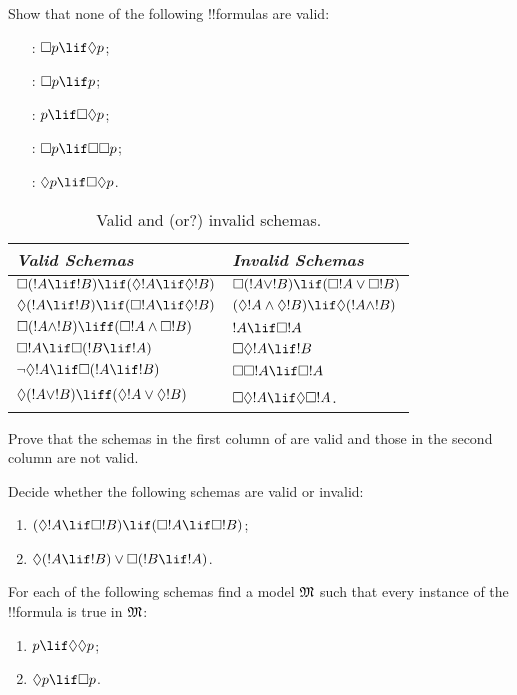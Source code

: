 \documentclass[../../../include/open-logic-section]{subfiles}
\begin{document}
\begin{prob}
  Show that none of the following !!{formula}s are valid:
  \begin{enumerate}
    \item[\Ax{D}:] \quad $\Box p \lif \Diamond p$;
    \item[\Ax{T}:] \quad $\Box p \lif p$;
    \item[\Ax{B}:] \quad $p \lif \Box\Diamond p$;
    \item[\Ax{4}:] \quad $\Box p \lif \Box \Box p$;
    \item[\Ax{5}:] \quad $\Diamond p \lif \Box \Diamond
      p$.
  \end{enumerate}
\end{prob}

\begin{table}[t]
    \centering
    \begin{tabular}{| l || l |}
      \hline
      {\emph{Valid Schemas}} & {\emph{Invalid Schemas}} \\
      \hline\hline
      $\Box(!A \lif !B) \lif (\Diamond !A \lif \Diamond !B)$
      & $\Box (!A \lor !B) \lif (\Box !A \lor \Box !B)$ \\
      $\Diamond (!A \lif !B) \lif (\Box !A \lif \Diamond
      !B)$ 
      & $(\Diamond !A \land \Diamond !B) \lif \Diamond (!A
      \land !B)$\\
      $\Box (!A \land !B) \liff (\Box !A \land \Box !B)$
      & $!A \lif \Box !A$ \\
      $\Box !A \lif \Box (!B \lif !A)$ 
      & $\Box \Diamond !A \lif !B$ \\
      $\lnot \Diamond !A \lif \Box (!A \lif !B)$
      & $\Box \Box !A \lif \Box !A$ \\
      $\Diamond (!A \lor !B) \liff (\Diamond !A \lor
      \Diamond !B)$
      & $\Box \Diamond !A \lif \Diamond \Box !A$. \\
      \hline
    \end{tabular}
    \caption{Valid and (or?) invalid schemas.}
\end{table}

\begin{prob}%
  Prove that the schemas in the first column of
   are valid and those in
  the second column are not valid.
\end{prob}

\begin{prob}
  Decide whether the following schemas are valid or invalid:
  \begin{enumerate}
  \item $(\Diamond !A \lif \Box !B) \lif (\Box !A \lif \Box
    !B)$;
  \item $\Diamond(!A \lif !B) \lor \Box(!B \lif !A)$.
  \end{enumerate}
\end{prob}

\begin{prob}
  For each of the following schemas find a model $\mathfrak M$ such
  that every instance of the !!{formula} is true in $\mathfrak M$:
  \begin{enumerate}
  \item $p \lif \Diamond\Diamond p$;
  \item $\Diamond p \lif \Box p$.
  \end{enumerate}
\end{prob}
\end{document}
